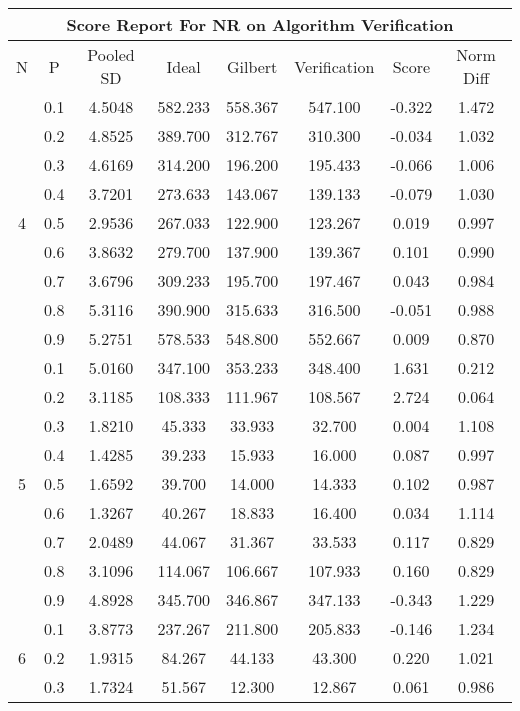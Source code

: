 \documentclass[11pt,a4paper]{report}
\begin{document}
\begin{longtable}{ | c | c || c | c | c | c | c | c | }
\hline
\multicolumn{8}{|c|}{ Score Report For NR on Algorithm Verification} \\
\hline
N & P & Pooled SD &  Ideal &  Gilbert & Verification  & Score & Norm Diff \\
 \hline
 \hline
 \endhead
\multirow{9}{*}{4} & 0.1 & 4.5048 & 582.233 & 558.367 & 547.100 & -0.322 & 1.472 \\
 & 0.2 & 4.8525 & 389.700 & 312.767 & 310.300 & -0.034 & 1.032 \\
 & 0.3 & 4.6169 & 314.200 & 196.200 & 195.433 & -0.066 & 1.006 \\
 & 0.4 & 3.7201 & 273.633 & 143.067 & 139.133 & -0.079 & 1.030 \\
 & 0.5 & 2.9536 & 267.033 & 122.900 & 123.267 & 0.019 & 0.997 \\
 & 0.6 & 3.8632 & 279.700 & 137.900 & 139.367 & 0.101 & 0.990 \\
 & 0.7 & 3.6796 & 309.233 & 195.700 & 197.467 & 0.043 & 0.984 \\
 & 0.8 & 5.3116 & 390.900 & 315.633 & 316.500 & -0.051 & 0.988 \\
 & 0.9 & 5.2751 & 578.533 & 548.800 & 552.667 & 0.009 & 0.870 \\
 \hline
\multirow{9}{*}{5} & 0.1 & 5.0160 & 347.100 & 353.233 & 348.400 & 1.631 & 0.212 \\
 & 0.2 & 3.1185 & 108.333 & 111.967 & 108.567 & 2.724 & 0.064 \\
 & 0.3 & 1.8210 & 45.333 & 33.933 & 32.700 & 0.004 & 1.108 \\
 & 0.4 & 1.4285 & 39.233 & 15.933 & 16.000 & 0.087 & 0.997 \\
 & 0.5 & 1.6592 & 39.700 & 14.000 & 14.333 & 0.102 & 0.987 \\
 & 0.6 & 1.3267 & 40.267 & 18.833 & 16.400 & 0.034 & 1.114 \\
 & 0.7 & 2.0489 & 44.067 & 31.367 & 33.533 & 0.117 & 0.829 \\
 & 0.8 & 3.1096 & 114.067 & 106.667 & 107.933 & 0.160 & 0.829 \\
 & 0.9 & 4.8928 & 345.700 & 346.867 & 347.133 & -0.343 & 1.229 \\
 \hline
\multirow{9}{*}{6} & 0.1 & 3.8773 & 237.267 & 211.800 & 205.833 & -0.146 & 1.234 \\
 & 0.2 & 1.9315 & 84.267 & 44.133 & 43.300 & 0.220 & 1.021 \\
 & 0.3 & 1.7324 & 51.567 & 12.300 & 12.867 & 0.061 & 0.986 \\

\end{longtable}
\end{document}
